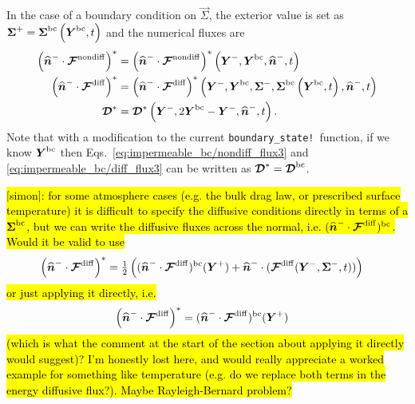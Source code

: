 \documentclass{report}
\begin{document}
In the case of a boundary condition on $\vec{\Sigma}$, the exterior value is set
as $\vec{\Sigma}^{+} = \vec{\Sigma}^{\rm bc}\left(\vec{Y}^{\rm bc}, t\right)$
and the numerical fluxes are
\begin{align}
  {\left( \nhat^{-} \cdot \Fnondiff\right)}^{*} &=
  {\left( \nhat^{-} \cdot \Fnondiff\right)}^{*}
  \left(\vec{Y}^{-}, \vec{Y}^{\rm bc}, \nhat^{-}, t\right)
   \label{eq:impermeable_bc/diff_flux1} \\
  {\left( \nhat^{-} \cdot \Fdiff\right)}^{*} &=
  {\left( \nhat^{-} \cdot \Fdiff\right)}^{*}
  \left(\vec{Y}^{-}, \vec{Y}^{\rm bc}, \vec{\Sigma}^{-}, \vec{\Sigma}^{\rm bc}
  \left(\vec{Y}^{\rm bc}, t\right),
  \nhat^{-}, t\right) 
   \label{eq:impermeable_bc/diff_flux2} \\
  \diffusive^{*} &=
  \diffusive^{*}
  \left(\vec{Y}^{-}, 2\vec{Y}^{\rm bc}-\vec{Y}^{-}, \nhat^{-}, t\right).
  \label{eq:impermeable_bc/diff_flux3}
\end{align}
Note that with a modification to the current \texttt{boundary\_state!}\ function, if we know $\vec{Y}^{\rm bc}$ then Eqs.\ \eqref{eq:impermeable_bc/nondiff_flux3} and \eqref{eq:impermeable_bc/diff_flux3} can be written as $\diffusive^{*} =
  \diffusive^{\rm bc}$.
  
\hl{[simon]: for some atmosphere cases (e.g. the bulk drag law, or prescribed surface temperature) it is difficult to specify the diffusive conditions directly in terms of a $\vec{\Sigma}^{\rm bc}$, but we can write the diffusive fluxes across the normal, i.e. $(\nhat^{-}\cdot \Fdiff)^{\rm bc}$. Would it be valid to use}
\begin{align}
    {\left( \nhat^{-} \cdot \Fdiff\right)}^{*} &=
    \tfrac{1}{2} \left( 
     (\nhat^{-}\cdot \Fdiff)^{\rm bc}(\vec{Y}^{+})
      +
      \nhat^{-}\cdot (\Fdiff(\vec{Y}^{-}, \vec{\Sigma}^{-}, t))
    \right)
\end{align}
\hl{or just applying it directly, i.e.}
\begin{align}
    {\left( \nhat^{-} \cdot \Fdiff\right)}^{*} &=
      (\nhat^{-}\cdot \Fdiff)^{\rm bc}(\vec{Y}^{+})
\end{align}
\hl{(which is what the comment at the start of the section about applying it directly would suggest)? I'm honestly lost here, and would really appreciate a worked example for something like temperature (e.g. do we replace both terms in the energy diffusive flux?).  Maybe Rayleigh-Bernard problem?}
\end{document}
